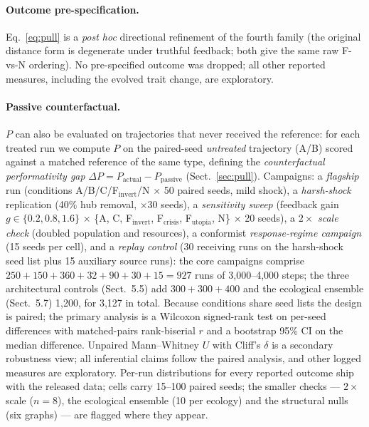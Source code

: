 \documentclass{svproc}
\begin{document}
\paragraph{Outcome pre-specification.} Eq.~\ref{eq:pull} is a \emph{post hoc}
directional refinement of the fourth family (the original distance form is
degenerate under truthful feedback; both give the same raw F-vs-N ordering).
No pre-specified outcome was dropped; all other reported measures, including
the evolved trait change, are exploratory.

\paragraph{Passive counterfactual.} $P$ can also be evaluated on trajectories
that never received the reference: for each treated run we compute $P$ on the
paired-seed \emph{untreated} trajectory (A/B) scored against a matched
reference of the same type, defining the
\emph{counterfactual performativity gap} $\Delta P = P_{\mathrm{actual}} -
P_{\mathrm{passive}}$ (Sect.~\ref{sec:pull}). Campaigns: a \emph{flagship} run (conditions
A/B/C/F$_{\mathrm{invert}}$/N $\times$ 50 paired seeds, mild shock), a
\emph{harsh-shock} replication (40\% hub removal, $\times$30 seeds),
a \emph{sensitivity sweep} (feedback gain $g\in\{0.2,0.8,1.6\}$ $\times$
\{A, C, F$_{\mathrm{invert}}$, F$_{\mathrm{crisis}}$, F$_{\mathrm{utopia}}$,
N\} $\times$ 20 seeds), a $2\times$ \emph{scale check} (doubled population and resources), a conformist \emph{response-regime campaign} (15 seeds per cell), and a \emph{replay control} (30 receiving runs on the harsh-shock seed list plus 15 auxiliary source runs): the core campaigns comprise $250+150+360+32+90+30+15 = 927$ runs of 3{,}000--4{,}000 steps; the three architectural controls (Sect.~5.5) add $300+300+400$ and the ecological ensemble (Sect.~5.7) 1{,}200, for 3{,}127 in total. Because conditions share seed lists the design is paired; the primary
analysis is a Wilcoxon signed-rank test on per-seed differences with
matched-pairs rank-biserial $r$ and a bootstrap 95\% CI on the median
difference. Unpaired Mann--Whitney $U$ with Cliff's $\delta$ is a secondary
robustness view; all inferential claims follow the paired analysis, and
other logged measures are exploratory. Per-run distributions for every
reported outcome ship with the released data; cells carry 15--100 paired
seeds; the smaller checks --- $2\times$ scale ($n=8$), the ecological
ensemble (10 per ecology) and the structural nulls (six graphs) --- are
flagged where they appear.
\end{document}
